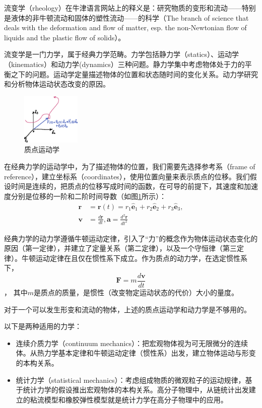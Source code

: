 \documentclass[main.tex]{subfiles}
\begin{document}
流变学（rheology）在牛津语言网站上的释义是：研究物质的变形和流动——特别是液体的非牛顿流动和固体的塑性流动——的科学（The branch of science that deals with the deformation and flow of matter, esp. the non-Newtonian flow of liquids and the plastic flow of solids）。

流变学是一门力学，属于经典力学范畴。力学包括静力学（statics）、运动学（kinematics）和动力学(dynamics）三种问题。静力学集中考虑物体处于力的平衡之下的问题。运动学定量描述物体的位置和状态随时间的变化关系。动力学研究和分析物体运动状态改变的原因。\cite[p.~1]{邓文基2009大物上}

\begin{figure}
\centering
\includegraphics[width=0.25\textwidth]{images/I.1.1.eps}
\caption{质点运动学}
\label{fig:I.1.1}
\end{figure}

在经典力学的运动学中，为了描述物体的位置，我们需要先选择参考系（frame of reference），建立坐标系（coordinates），使用位置向量来表示质点的位移。我们假设时间是连续的，把质点的位移写成时间的函数，在可导的前提下，其速度和加速度分别是位移的一阶和二阶时间导数\cite[附录A,p.~422]{邓文基2009大物上}（如图\ref{fig:I.1.1}所示）：
\begin{align*}
\mathbf{r}&=\mathbf{r}\left(t\right)=r_1\mathbf{\hat{e}}_1+r_2\mathbf{\hat{e}}_2+r_3\mathbf{\hat{e}}_3,\\
\mathbf{v}&=\frac{d\mathbf{r}}{dt},\mathbf{a}=\frac{d^2\mathbf{r}}{dt^2}
\end{align*}

经典力学的动力学遵循牛顿运动定律，引入了“力”的概念作为物体运动状态变化的原因（第一定律），并建立了定量关系（第二定律），以及一个守恒律（第三定律）。牛顿运动定律在且仅在惯性系下成立。作为质点的动力学，在选定惯性系下，
\[\mathbf{F}=m\frac{d\mathbf{v}}{dt}\]，
其中$m$是质点的质量，是惯性（改变物定运动状态的代价）大小的量度。

对于一个可以发生形变和流动的物体，上述的质点运动学和动力学是不够用的。

以下是两种适用的力学：
\begin{itemize}
    \item 连续介质力学（continuum mechanics）：把宏观物体视为可无限微分的连续体。从热力学基本定律和牛顿运动定律（惯性系）出发，建立物体运动与形变的本构关系。
    \item 统计力学（statistical mechanics）：考虑组成物质的微观粒子的运动规律，基于统计力学的假设推出宏观物体的本构关系。高分子物理中，从链统计出发建立的粘流模型和橡胶弹性模型就是统计力学在高分子物理中的应用。
\end{itemize}
\end{document}
